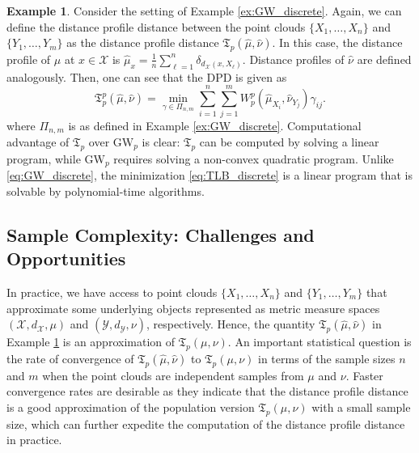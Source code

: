 \documentclass[11pt,letterpaper]{article}
\theoremstyle{definition}
\newtheorem{example}{Example}
\numberwithin{equation}{section}
\newcommand{\cX}{\mathcal{X}}
\newcommand{\cY}{\mathcal{Y}}
\begin{document}
\begin{example}
    \label{ex:TLB_discrete}
    Consider the setting of Example \ref{ex:GW_discrete}. Again, we can define the distance profile distance between the point clouds $\{X_1, \ldots, X_n\}$ and $\{Y_1, \ldots, Y_m\}$ as the distance profile distance $\mathfrak{T}_p(\hat{\mu}, \hat{\nu})$. In this case, the distance profile of $\hat{\mu}$ at $x \in \cX$ is $\hat{\mu}_x = \frac{1}{n} \sum_{\ell = 1}^{n} \delta_{d_\cX(x, X_\ell)}$. Distance profiles of $\hat{\nu}$ are defined analogously. Then, one can see that the DPD is given as
    \begin{equation}
        \label{eq:TLB_discrete}
        \mathfrak{T}_p^p(\hat{\mu}, \hat{\nu}) = \min_{\gamma \in \Pi_{n, m}} \sum_{i = 1}^{n} \sum_{j = 1}^{m} W_p^p(\hat{\mu}_{X_i}, \hat{\nu}_{Y_j}) \gamma_{i j}.
    \end{equation}
    where $\Pi_{n, m}$ is as defined in Example \ref{ex:GW_discrete}. Computational advantage of $\mathfrak{T}_p$ over $\mathrm{GW}_p$ is clear: $\mathfrak{T}_p$ can be computed by solving a linear program, while $\mathrm{GW}_p$ requires solving a non-convex quadratic program. Unlike \eqref{eq:GW_discrete}, the minimization \eqref{eq:TLB_discrete} is a linear program that is solvable by polynomial-time algorithms.     
\end{example}


\subsection{Sample Complexity: Challenges and Opportunities}
\label{sec:connection_GW_TLB}
In practice, we have access to point clouds $\{X_1, \ldots, X_n\}$ and $\{Y_1, \ldots, Y_m\}$ that approximate some underlying objects represented as metric measure spaces $(\cX, d_\cX, \mu)$ and $(\cY, d_\cY, \nu)$, respectively. Hence, the quantity $\mathfrak{T}_p(\hat{\mu}, \hat{\nu})$ in Example \ref{ex:TLB_discrete} is an approximation of $\mathfrak{T}_p(\mu, \nu)$. An important statistical question is the rate of convergence of $\mathfrak{T}_p(\hat{\mu}, \hat{\nu})$ to $\mathfrak{T}_p(\mu, \nu)$ in terms of the sample sizes $n$ and $m$ when the point clouds are independent samples from $\mu$ and $\nu$. Faster convergence rates are desirable as they indicate that the distance profile distance is a good approximation of the population version $\mathfrak{T}_p(\mu, \nu)$ with a small sample size, which can further expedite the computation of the distance profile distance in practice.
\end{document}
